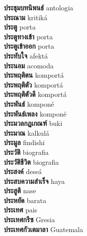 \textbf{ ประชุมบทนิพนธ์  } antologia \\
\textbf{ ประณาม  } kritiká \\
\textbf{ ประตู  } porta \\
\textbf{ ประตูทางเข้า  } porta \\
\textbf{ ประตูเข้าออก  } porta \\
\textbf{ ประทับใจ  } afektá \\
\textbf{ ประนอม  } acomoda \\
\textbf{ ประพฤติตน  } komportá \\
\textbf{ ประพฤติตัว  } komportá \\
\textbf{ ประพฤติตัวดี  } komportá \\
\textbf{ ประพันธ์  } komponé \\
\textbf{ ประพันธ์เพลง  } komponé \\
\textbf{ ประมวลกฏเกณฑ์  } buki \\
\textbf{ ประมาณ  } kalkulá \\
\textbf{ ประมูล  } findishi \\
\textbf{ ประวัติ  } biografia \\
\textbf{ ประวัติชีวิต  } biografia \\
\textbf{ ประสงค์  } deseá \\
\textbf{ ประสบความสำเร็จ  } haya \\
\textbf{ ประสูติ  } nase \\
\textbf{ ประหยัด  } barata \\
\textbf{ ประเทศ  } pais \\
\textbf{ ประเทศกรีซ  } Gresia \\
\textbf{ ประเทศกัวเตมาลา  } Guatemala \\
